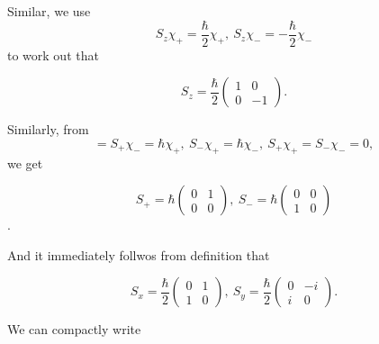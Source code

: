 Similar, we use 
\begin{equation}
S_z\chi_+=\frac{\hbar}{2}\chi_+,\ S_z\chi_-=-\frac{\hbar}{2}\chi_-
\end{equation}
to work out that
\begin{singlespace}
\begin{equation}
S_z=\frac{\hbar}{2}
\begin{pmatrix}
1&0\\
0&-1
\end{pmatrix}.
\end{equation}
\end{singlespace}
Similarly, from
\begin{equation}
=S_+\chi_-=\hbar\chi_+,\ S_-\chi_+=\hbar\chi_-,\ S_+\chi_+=S_-\chi_-=0, 
\end{equation}
we get 
\begin{singlespace}
\begin{equation}
S_+=\hbar
\begin{pmatrix}
0&1\\0&0
\end{pmatrix},\ 
S_-=\hbar
\begin{pmatrix}
0&0\\1&0
\end{pmatrix}
\end{equation}.
\end{singlespace}
And it immediately follwos from definition that
\begin{singlespace}
\begin{equation}
S_x=\frac{\hbar}{2}
\begin{pmatrix}
0&1\\1&0
\end{pmatrix},\ 
S_y=\frac{\hbar}{2}
\begin{pmatrix}
0&-i\\i&0
\end{pmatrix}. 
\end{equation}
\end{singlespace}
We can compactly write
